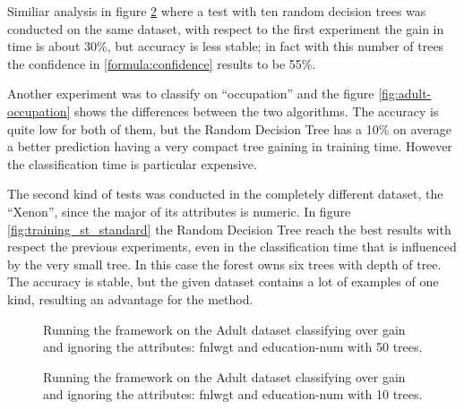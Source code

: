 \documentclass{acm_proc_article-sp-sigmod07}
\begin{document}
Similiar analysis in figure \ref{fig:adult-10} where a test with ten
random decision trees was conducted on the same dataset, with respect to
the first experiment the gain in time is about 30\%, but accuracy is less
stable; in fact with this number of trees the confidence in
\ref{formula:confidence} results to be 55\%.

Another experiment was to classify on ``occupation'' and the figure
\ref{fig:adult-occupation} shows the differences between the two
algorithms. The accuracy is quite low for both of them, but the Random
Decision Tree has a 10\% on average a better prediction having a very
compact tree gaining in training time. However the classification time is
particular expensive.

The second kind of tests was conducted in the completely different
dataset, the ``Xenon'', since the major of its attributes is numeric.
In figure \ref{fig:training_st_standard} the Random Decision Tree reach
the best results with respect the previous experiments, even in the
classification time that is influenced by the very small tree. In this
case the forest owns six trees with depth of tree. The accuracy is stable,
but the given dataset contains a lot of examples of one kind, resulting an
advantage for the method.

\begin{figure*}
\label{fig:adult_standard}
\centering
{}
\caption{Running the framework on the Adult dataset classifying over gain
and ignoring the attributes: fnlwgt and education-num.}
\end{figure*}

\begin{figure}
\label{fig:adult-50}
\centering
{}
\caption{Running the framework on the Adult dataset classifying over gain
and ignoring the attributes: fnlwgt and education-num with 50 trees.}
\end{figure}

\begin{figure}
\label{fig:adult-10}
\centering
{}
\caption{Running the framework on the Adult dataset classifying over gain
and ignoring the attributes: fnlwgt and education-num with 10 trees.}
\end{figure}
\end{document}
